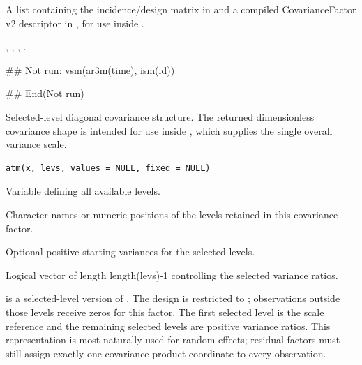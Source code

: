 \documentclass[a4paper]{book}
\begin{document}
%
\begin{Value}
A list containing the incidence/design matrix in  and a compiled CovarianceFactor v2 descriptor in , for use inside .
\end{Value}
%
\begin{SeeAlso}\relax
{}, , , .
\end{SeeAlso}
%
\begin{Examples}
\begin{ExampleCode}
## Not run: 
vsm(ar3m(time), ism(id))

## End(Not run)
\end{ExampleCode}
\end{Examples}
%
\begin{Description}\relax
Selected-level diagonal covariance structure. The returned dimensionless covariance shape is intended for use inside , which supplies the single overall variance scale.
\end{Description}
%
\begin{Usage}
\begin{verbatim}
atm(x, levs, values = NULL, fixed = NULL)
\end{verbatim}
\end{Usage}
%
\begin{Arguments}
\begin{ldescription}
\item[\code{x}] Variable defining all available levels.
\item[\code{levs}] Character names or numeric positions of the levels retained in this covariance factor.
\item[\code{values}] Optional positive starting variances for the selected levels.
\item[\code{fixed}] Logical vector of length length(levs)-1 controlling the selected variance ratios.
\end{ldescription}
\end{Arguments}
%
\begin{Details}\relax
{} is a selected-level version of .  The design is restricted to ; observations outside those levels receive zeros for this factor.  The first selected level is the scale reference and the remaining selected levels are positive variance ratios.  This representation is most naturally used for random effects; residual factors must still assign exactly one covariance-product coordinate to every observation.
\end{Details}
\end{document}
